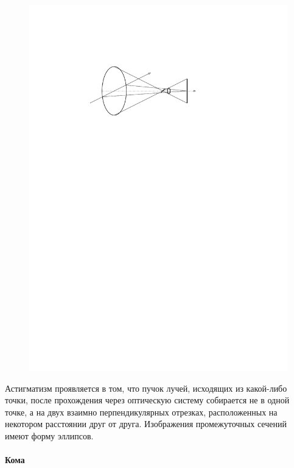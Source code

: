 \begin{figure}
	\centering
	\vspace{-1pc}
	\includegraphics[width=0.4\tw]{img/astigmatism.pdf}
	\caption{}
	\label{pic:astigmatism}
\end{figure}
Астигматизм проявляется в том, что пучок лучей, исходящих из какой-либо точки, после прохождения через оптическую систему собирается не в одной точке, а на двух взаимно перпендикулярных отрезках, расположенных на некотором расстоянии друг от друга. Изображения промежуточных сечений имеют форму эллипсов.

\paragraph{Кома}

